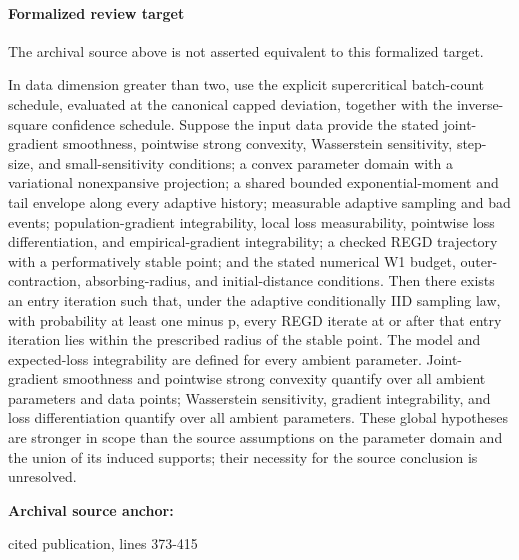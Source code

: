 \documentclass[10pt]{article}
\begin{document}
\paragraph{Formalized review target}
The archival source above is not asserted equivalent to this formalized target.
\begin{ReviewVerbatim}
In data dimension greater than two, use the explicit supercritical batch-count schedule, evaluated at the canonical capped deviation, together with the inverse-square confidence schedule. Suppose the input data provide the stated joint-gradient smoothness, pointwise strong convexity, Wasserstein sensitivity, step-size, and small-sensitivity conditions; a convex parameter domain with a variational nonexpansive projection; a shared bounded exponential-moment and tail envelope along every adaptive history; measurable adaptive sampling and bad events; population-gradient integrability, local loss measurability, pointwise loss differentiation, and empirical-gradient integrability; a checked REGD trajectory with a performatively stable point; and the stated numerical W1 budget, outer-contraction, absorbing-radius, and initial-distance conditions. Then there exists an entry iteration such that, under the adaptive conditionally IID sampling law, with probability at least one minus p, every REGD iterate at or after that entry iteration lies within the prescribed radius of the stable point. The model and expected-loss integrability are defined for every ambient parameter. Joint-gradient smoothness and pointwise strong convexity quantify over all ambient parameters and data points; Wasserstein sensitivity, gradient integrability, and loss differentiation quantify over all ambient parameters. These global hypotheses are stronger in scope than the source assumptions on the parameter domain and the union of its induced supports; their necessity for the source conclusion is unresolved.
\end{ReviewVerbatim}

\textbf{Archival source anchor:} {\footnotesize\raggedright cited publication, lines 373-\allowbreak{}415\par}
\end{document}
